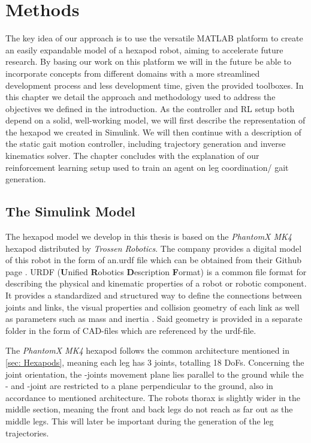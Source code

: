 \chapter{Methods}
\label{ch:methods}

The key idea of our approach is to use the versatile MATLAB platform to create an easily expandable model of a hexapod robot, aiming to accelerate future research.
By basing our work on this platform we will in the future be able to incorporate concepts from different domains with a more streamlined development process and less development time, given the provided toolboxes.
In this chapter we detail the approach and methodology used to address the objectives we defined in the introduction.
As the controller and RL setup both depend on a solid, well-working model, we will first describe the representation of the hexapod we created in Simulink.
We will then continue with a description of the static gait motion controller, including trajectory generation and inverse kinematics solver.
The chapter concludes with the explanation of our reinforcement learning setup used to train an agent on leg coordination/ gait generation.


\section{The Simulink Model}
The hexapod model we develop in this thesis is based on the \textit{PhantomX MK4} hexapod distributed by \textit{Trossen Robotics}.
The company provides a digital model of this robot in the form of an.urdf file which can be obtained from their Github page \parencite{interboticsGithub}.
URDF (\textbf{U}nified \textbf{R}obotics \textbf{D}escription \textbf{F}ormat) is a common file format for describing the physical and kinematic properties of a robot or robotic component.
It provides a standardized and structured way to define the connections between joints and links, the visual properties and collision geometry of each link as well as parameters such as mass and inertia \parencite{matlabURDFDocumentation}.
Said geometry is provided in a separate folder in the form of CAD-files which are referenced by the urdf-file.

The \textit{PhantomX MK4} hexapod follows the common architecture mentioned in \ref{sec: Hexapods}, meaning each leg has 3 joints, totalling 18 DoFs.
Concerning the joint orientation, the \textalpha-joints movement plane lies parallel to the ground while the \textbeta- and \textgamma-joint are restricted to a plane perpendicular to the ground, also in accordance to mentioned architecture.
The robots thorax is slightly wider in the middle section, meaning the front and back legs do not reach as far out as the middle legs.
This will later be important during the generation of the leg trajectories.

